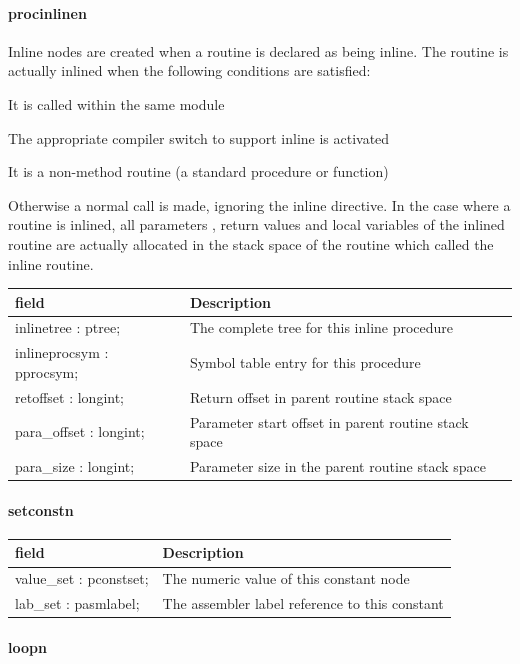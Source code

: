\documentclass [12pt]{article}
\begin{document}
\paragraph{procinlinen}\mbox{}

Inline nodes are created when a routine is declared as being inline. The 
routine is actually inlined when the following conditions are satisfied:

It is called within the same module

The appropriate compiler switch to support inline is activated

It is a non-method routine (a standard procedure or function)

Otherwise a normal call is made, ignoring the inline directive. In the case 
where a routine is inlined, all parameters , return values and local 
variables of the inlined routine are actually allocated in the stack space 
of the routine which called the inline routine.

\begin{longtable}{|l|p{10cm}|}
\hline
field	& Description \\
\hline
\endhead
\hline
\endfoot
\textsf{inlinetree : ptree;}& 
The complete tree for this inline procedure \\
\textsf{inlineprocsym : pprocsym;}& 
Symbol table entry for this procedure \\
\textsf{retoffset : longint;}& 
Return offset in parent routine stack space \\
\textsf{para{\_}offset : longint;}& 
Parameter start offset in parent routine stack space \\
\textsf{para{\_}size : longint;}& 
Parameter size in the parent routine stack space 
\label{tab26}
\end{longtable}

\paragraph{setconstn}\mbox{}

\begin{longtable}{|l|p{10cm}|}
\hline
field	& Description \\
\hline
\endhead
\hline
\endfoot
\textsf{value{\_}set : pconstset;}& The numeric value of this constant node \\
\textsf{lab{\_}set : pasmlabel;}& The assembler label reference to this constant 
\label{tab27}
\end{longtable}

\paragraph{loopn}\mbox{}
\end{document}
